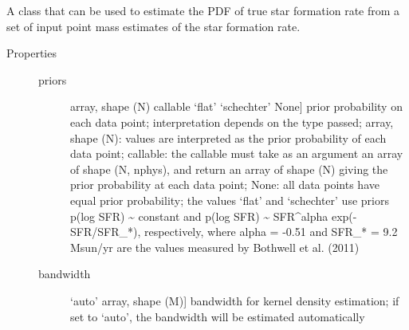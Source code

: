 \documentclass[letterpaper,10pt,english]{sphinxmanual}
\begin{document}
\begin{fulllineitems}
\label{sfr_slug:slugpy.sfr_slug.sfr_slug}
A class that can be used to estimate the PDF of true star
formation rate from a set of input point mass estimates of the
star formation rate.
\begin{description}
\item[{Properties}] \leavevmode\begin{description}
\item[{priors}] \leavevmode{[}array, shape (N) \textbar{} callable \textbar{} `flat' \textbar{} `schechter' \textbar{} None{]}
prior probability on each data point; interpretation
depends on the type passed; array, shape (N): values are
interpreted as the prior probability of each data point;
callable: the callable must take as an argument an array
of shape (N, nphys), and return an array of shape (N)
giving the prior probability at each data point; None:
all data points have equal prior probability; the values
`flat' and `schechter' use priors p(log SFR) \textasciitilde{} constant and
p(log SFR) \textasciitilde{} SFR\textasciicircum{}alpha exp(-SFR/SFR\_*), respectively, where
alpha = -0.51 and SFR\_* = 9.2 Msun/yr are the values
measured by Bothwell et al. (2011)

\item[{bandwidth}] \leavevmode{[}`auto' \textbar{} array, shape (M){]}
bandwidth for kernel density estimation; if set to
`auto', the bandwidth will be estimated automatically

\end{description}

\end{description}

\begin{fulllineitems}
\label{sfr_slug:slugpy.sfr_slug.sfr_slug.__init__}~\begin{quote}


\end{quote}
\end{fulllineitems}
\end{fulllineitems}
\end{document}
